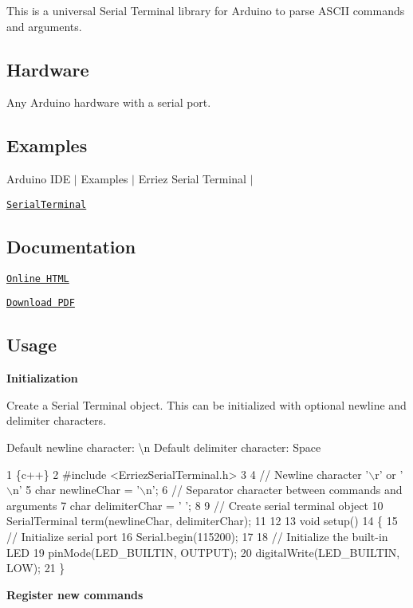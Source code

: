 \href{https://travis-ci.org/Erriez/ErriezSerialTerminal}{\tt }

This is a universal Serial Terminal library for Arduino to parse A\+S\+C\+II commands and arguments.



\subsection*{Hardware}

Any Arduino hardware with a serial port.

\subsection*{Examples}

Arduino I\+DE $\vert$ Examples $\vert$ Erriez Serial Terminal $\vert$


\begin{DoxyItemize}
\item \href{https://github.com/Erriez/ErriezSerialTerminal/blob/master/examples/SerialTerminal/SerialTerminal.ino}{\tt Serial\+Terminal}
\end{DoxyItemize}

\subsection*{Documentation}


\begin{DoxyItemize}
\item \href{https://erriez.github.io/ErriezSerialTerminal}{\tt Online H\+T\+ML}
\item \href{https://github.com/Erriez/ErriezSerialTerminal/raw/gh-pages/latex/ErriezSerialTerminal.pdf}{\tt Download P\+DF}
\end{DoxyItemize}

\subsection*{Usage}

{\bfseries Initialization}

Create a Serial Terminal object. This can be initialized with optional newline and delimiter characters.

Default newline character\+: {\ttfamily \textquotesingle{}\textbackslash{}n\textquotesingle{}} Default delimiter character\+: {\ttfamily Space}


\begin{DoxyCode}
1 \{c++\}
2 #include <ErriezSerialTerminal.h>
3 
4 // Newline character '\(\backslash\)r' or '\(\backslash\)n'
5 char newlineChar = '\(\backslash\)n'; 
6 // Separator character between commands and arguments
7 char delimiterChar = ' ';
8 
9 // Create serial terminal object
10 SerialTerminal term(newlineChar, delimiterChar);
11 
12 
13 void setup()
14 \{
15     // Initialize serial port
16     Serial.begin(115200);
17 
18     // Initialize the built-in LED
19     pinMode(LED\_BUILTIN, OUTPUT);
20     digitalWrite(LED\_BUILTIN, LOW);
21 \}
\end{DoxyCode}
 {\bfseries Register new commands}

